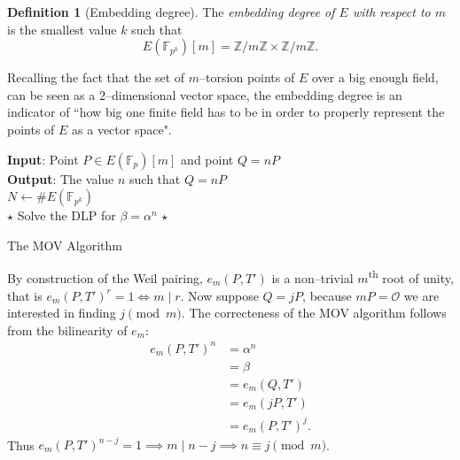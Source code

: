 \documentclass[9pt]{article}
\theoremstyle{definition}
\newtheorem{definition}{Definition}[section]
\begin{document}
\begin{definition}[Embedding degree]
The \textit{embedding degree of $E$ with respect to $m$} is the smallest value $k$ such that
$$E(\mathbb{F}_{p^k})[m] = \mathbb{Z}/m\mathbb{Z} \times \mathbb{Z}/m\mathbb{Z}.$$
\end{definition}

Recalling the fact that the set of $m$--torsion points of $E$ over a big enough field, can be seen as a 2--dimensional vector space, the embedding degree is an indicator of ``how big one finite field has to be in order to properly represent the points of $E$ as a vector space".

\begin{algorithm}[H]
	\SetAlgoLined
	\textbf{Input}: Point $P \in E(\mathbb{F}_p)[m]$ and point $Q = nP$\\
	\textbf{Output}: The value $n$ such that $Q = nP$ \\ 
	$N \gets \#E(\mathbb{F}_{p^k})$ \\
    $\star$ Solve the DLP for $\beta = \alpha^n$ $\star$\\
	\caption{The MOV Algorithm}
	\label{alg:MOV}
\end{algorithm}

By construction of the Weil pairing, $e_m(P, T')$ is a non--trivial $m$\textsuperscript{th} root of unity, that is $e_m(P, T')^r = 1 \iff m \;\vert\; r$. Now suppose $Q = j P$, because $m P = \mathcal{O}$ we are interested in finding $j \pmod{m}$. The correcteness of the MOV algorithm follows from the bilinearity of $e_m$:
\begin{align*}
    e_m(P, T')^n &= \alpha^n\\ &= \beta \\&= e_m(Q, T')\\
                 &= e_m(j P, T')\\
                 &= e_m(P, T')^j.
\end{align*}
Thus $e_m(P, T')^{n-j} = 1 \implies m \;\vert\; n-j \implies n \equiv j \pmod{m}$.
\end{document}
